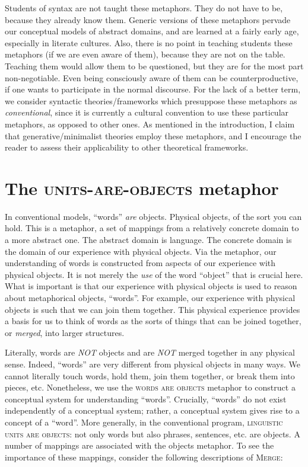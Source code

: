   Students of syntax are not taught these metaphors. They do not have to be, because they already know them. Generic versions of these metaphors pervade our conceptual models of abstract domains, and are learned at a fairly early age, especially in literate cultures. Also, there is no point in teaching students these metaphors (if we are even aware of them), because they are not on the table. Teaching them would allow them to be questioned, but they are for the most part non-negotiable. Even being consciously aware of them can be counterproductive, if one wants to participate in the normal discourse. For the lack of a better term, we consider syntactic theories/frameworks which presuppose these metaphors as \textit{conventional}, since it is currently a cultural convention to use these particular metaphors, as opposed to other ones. As mentioned in the introduction, I claim that generative/minimalist theories employ these metaphors, and I encourage the reader to assess their applicability to other theoretical frameworks.

\section{{The} {\textsc{units-}}{\textsc{are}}{\textsc{{}-objects}}{ metaphor}} 

In conventional models, “words” \textit{are} objects. Physical objects, of the sort you can hold. This is a metaphor, a set of mappings from a relatively concrete domain to a more abstract one. The abstract domain is language. The concrete domain is the domain of our experience with physical objects. Via the metaphor, our understanding of words is constructed from aspects of our experience with physical objects. It is not merely the \textit{use} of the word “object” that is crucial here. What is important is that our experience with physical objects is used to reason about metaphorical objects, “words”. For example, our experience with physical objects is such that we can join them together. This physical experience provides a basis for us to think of words as the sorts of things that can be joined together, or \textit{merged}, into larger structures.

  Literally, words are \textit{NOT} objects and are \textit{NOT} merged together in any physical sense. Indeed, “words” are very different from physical objects in many ways. We cannot literally touch words, hold them, join them together, or break them into pieces, etc. Nonetheless, we use the \textsc{words are objects} metaphor to construct a conceptual system for understanding “words”. Crucially, “words” do not exist independently of a conceptual system; rather, a conceptual system gives rise to a concept of a “word”. More generally, in the conventional program, \textsc{linguistic units are objects}: not only words but also phrases, sentences, etc. are objects. A number of mappings are associated with the objects metaphor. To see the importance of these mappings, consider the following descriptions of \textsc{Merge}: 

